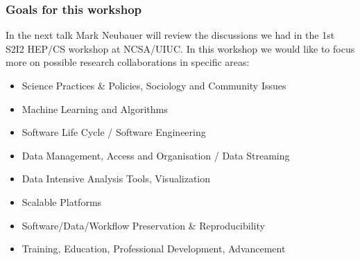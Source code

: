 \begin{frame}
\frametitle{Goals for this workshop}

In the next talk Mark Neubauer will review the discussions we had in the 1st S2I2 HEP/CS workshop at NCSA/UIUC. In this workshop we would like to focus more on possible research collaborations in specific areas:
\begin{itemize}
\item Science Practices \& Policies, Sociology and Community Issues
\item Machine Learning and Algorithms
\item Software Life Cycle / Software Engineering
\item Data Management, Access and Organisation / Data Streaming
\item Data Intensive Analysis Tools, Visualization
\item Scalable Platforms
\item Software/Data/Workflow Preservation \& Reproducibility
\item Training, Education, Professional Development, Advancement
\end{itemize}
\end{frame}



